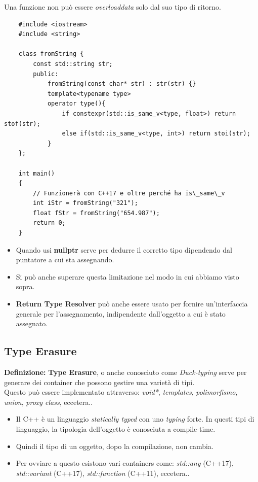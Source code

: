 \textsf{\small Una funzione non può essere \emph{overloaddata} solo dal suo tipo di ritorno.} \\

\begin{lstlisting}
	#include <iostream>
	#include <string>
	
	class fromString {
		const std::string str;
		public:
			fromString(const char* str) : str(str) {}
			template<typename type>
			operator type(){
				if constexpr(std::is_same_v<type, float>) return stof(str);
				else if(std::is_same_v<type, int>) return stoi(str);
			}
	};

	int main()
	{
		// Funzionerà con C++17 e oltre perché ha is\_same\_v
		int iStr = fromString("321");
		float fStr = fromString("654.987");
		return 0;
	}
\end{lstlisting}


\begin{itemize}
	\item \textsf{\small Quando usi \textbf{nullptr} serve per dedurre il corretto tipo dipendendo dal puntatore a cui sta assegnando.}
	\item \textsf{\small Si può anche superare questa limitazione nel modo in cui abbiamo visto sopra.}
	\item \textsf{\small \textbf{Return Type Resolver} può anche essere usato per fornire un'interfaccia generale per l'assegnamento, indipendente dall'oggetto a cui è stato assegnato.}
\end{itemize}

\subsection{Type Erasure}

\textsf{\small \textbf{Definizione: } \textbf{Type Erasure}, o anche conosciuto come \emph{Duck-typing} serve per generare dei container che possono gestire una varietà di tipi.} \\

\textsf{\small Questo può essere implementato attraverso: \emph{void*}, \emph{templates}, \emph{polimorfismo}, \emph{union}, \emph{proxy class}, eccetera..} \break

\begin{itemize}
	\item \textsf{\small Il C++ è un linguaggio \emph{statically typed} con uno \emph{typing} forte. In questi tipi di linguaggio, la tipologia dell'oggetto è conosciuta a compile-time.} %
	\item \textsf{\small Quindi il tipo di un oggetto, dopo la compilazione, non cambia.}
	\item \textsf{\small Per ovviare a questo esistono vari containers come: \emph{std::any} (C++17), \emph{std::variant} (C++17), \emph{std::function} (C++11), eccetera..}
\end{itemize}

